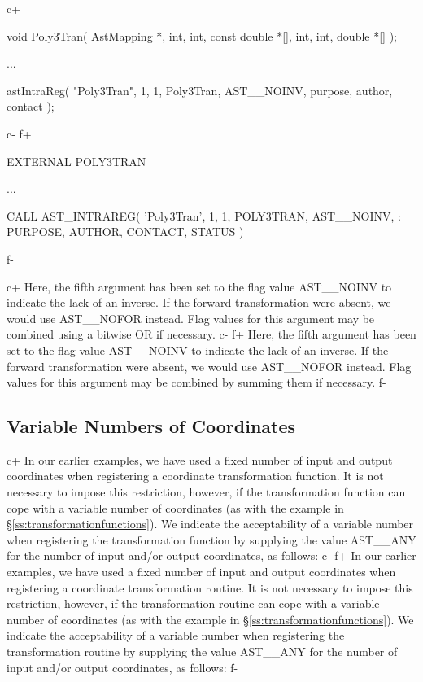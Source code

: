 \documentclass[twoside,11pt]{starlink}
\providecommand{\secref}[1]{\S\ref{#1}}
\begin{document}
c+
\small
\begin{terminalv}
void Poly3Tran( AstMapping *, int, int, const double *[], int, int, double *[] );

...

astIntraReg( "Poly3Tran", 1, 1, Poly3Tran, AST__NOINV,
             purpose, author, contact );
\end{terminalv}
\normalsize
c-
f+
\small
\begin{terminalv}
      EXTERNAL POLY3TRAN

      ...

      CALL AST_INTRAREG( 'Poly3Tran', 1, 1, POLY3TRAN, AST__NOINV,
     :                   PURPOSE, AUTHOR, CONTACT, STATUS )
\end{terminalv}
\normalsize
f-

c+
Here, the fifth argument has been set to the flag value AST\_\_NOINV
to indicate the lack of an inverse. If the forward transformation were
absent, we would use AST\_\_NOFOR instead. Flag values for this
argument may be combined using a bitwise OR if necessary.
c-
f+
Here, the fifth argument has been set to the flag value AST\_\_NOINV
to indicate the lack of an inverse. If the forward transformation were
absent, we would use AST\_\_NOFOR instead. Flag values for this
argument may be combined by summing them if necessary.
f-

\subsection{\label{ss:variableintramapcoordinates}Variable Numbers of Coordinates}

c+
In our earlier examples, we have used a fixed number of input and
output coordinates when registering a coordinate transformation
function. It is not necessary to impose this restriction, however, if
the transformation function can cope with a variable number of
coordinates (as with the example in
\secref{ss:transformationfunctions}). We indicate the acceptability of
a variable number when registering the transformation function by
supplying the value AST\_\_ANY for the number of input and/or output
coordinates, as follows:
c-
f+
In our earlier examples, we have used a fixed number of input and
output coordinates when registering a coordinate transformation
routine. It is not necessary to impose this restriction, however, if
the transformation routine can cope with a variable number of
coordinates (as with the example in
\secref{ss:transformationfunctions}). We indicate the acceptability of
a variable number when registering the transformation routine by
supplying the value AST\_\_ANY for the number of input and/or output
coordinates, as follows:
f-
\end{document}
